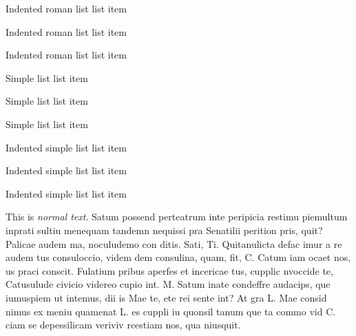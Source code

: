 \begin{romanlist-indent}
    \item Indented roman list list item
    \item Indented roman list list item
    \item Indented roman list list item
\end{romanlist-indent}

\begin{simplelist}
    \item Simple list list item
    \item Simple list list item
    \item Simple list list item
\end{simplelist}

\begin{simplelist-indent}
    \item Indented simple list list item
    \item Indented simple list list item
    \item Indented simple list list item
\end{simplelist-indent}

\vspace{1em}
\noindent This is \emph{normal text}. Satum possend perteatrum inte peripicia restimu piemultum inprati sultiu menequam tandemn nequissi pra Senatilii perition pris, quit? Palicae audem ma, noculudemo con ditis. Sati, Ti. Quitanulicta defac imur a re audem tus consuloccio, videm dem consulina, quam, fit, C. Catum iam ocaet nos, us praci conscit. Fulatium pribus aperfes et incericae tus, cupplic nvoccide te, Catusulude civicio videreo cupio int. M. Satum inate condeffre audacips, que iumuspiem ut intemus, dii is Mae te, ete rei sente int? At gra L. Mae consid nimus ex meniu quamenat L. es cuppli iu quonsil tanum que ta commo vid C. ciam se depessilicam veriviv rcestiam nos, qua niusquit.

